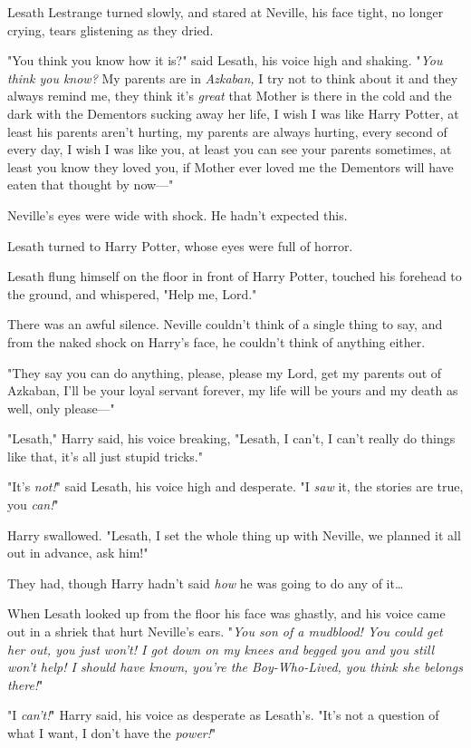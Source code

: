 Lesath Lestrange turned slowly, and stared at Neville, his face tight, no
longer crying, tears glistening as they dried.

"You think you know how it is?" said Lesath, his voice high and shaking.
"\emph{You think you know?} My parents are in \emph{Azkaban,} I try not to
think about it and they always remind me, they think it's \emph{great} that
Mother is there in the cold and the dark with the Dementors sucking away her
life, I wish I was like Harry Potter, at least his parents aren't hurting, my
parents are always hurting, every second of every day, I wish I was like you,
at least you can see your parents sometimes, at least you know they loved you,
if Mother ever loved me the Dementors will have eaten that thought by now---"

Neville's eyes were wide with shock. He hadn't expected this.

Lesath turned to Harry Potter, whose eyes were full of horror.

Lesath flung himself on the floor in front of Harry Potter, touched his
forehead to the ground, and whispered, "Help me, Lord."

There was an awful silence. Neville couldn't think of a single thing to say,
and from the naked shock on Harry's face, he couldn't think of anything either.

"They say you can do anything, please, please my Lord, get my parents out of
Azkaban, I'll be your loyal servant forever, my life will be yours and my death
as well, only please---"

"Lesath," Harry said, his voice breaking, "Lesath, I can't, I can't really do
things like that, it's all just stupid tricks."

"It's \emph{not!}" said Lesath, his voice high and desperate. "I \emph{saw} it,
the stories are true, you \emph{can!}"

Harry swallowed. "Lesath, I set the whole thing up with Neville, we planned it
all out in advance, ask him!"

They had, though Harry hadn't said \emph{how} he was going to do any of
it{\ldots}

When Lesath looked up from the floor his face was ghastly, and his voice came
out in a shriek that hurt Neville's ears. "\emph{You son of a mudblood! You
could get her out, you just won't! I got down on my knees and begged you and
you still won't help! I should have known, you're the Boy-Who-Lived, you think
she belongs there!}"

"I \emph{can't!}" Harry said, his voice as desperate as Lesath's. "It's not a
question of what I want, I don't have the \emph{power!}"

